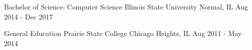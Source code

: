 


\begin{cventry}


\newcventry
{Bachelor of Science: Computer Science} %
{Illinois State University} %
{Normal, IL} %
{Aug 2014 - Dec 2017} %


\newcventry
{General Education} %
{Prairie State College} %
{ Chicago Heights, IL} %
{Aug 2011 - May 2014} %


\end{cventry}